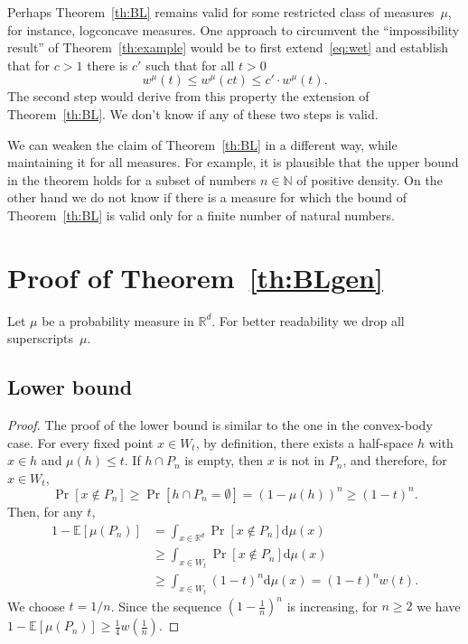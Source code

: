 \documentclass[10pt]{amsart}
\theoremstyle{definition}\newtheorem{defi}[theo]{Definition}\newtheorem{rema}[theo]{Remark}\newtheorem{exam}[theo]{Example}\newtheorem{exem}[theo]{Example}\newtheorem{nota}[theo]{Notation}
\newcommand*{\dd}{\mathrm{d}}
\newcommand{\Nbb}{\mathbb{N}}%
\newcommand{\Rbb}{\mathbb{R}}%
\newcommand{\Ebb}{\mathbb{E}}%
\newcommand*{\mtfrac}[2]{\frac{#1}{#2}}%
\begin{document}
Perhaps Theorem~\ref{th:BL} remains valid for some restricted class of measures~$\mu$, for instance, logconcave measures. One approach to circumvent the ``impossibility result'' of Theorem~\ref{th:example} would be to first extend~\eqref{eq:wet} and establish that for $c>1$ there is $c'$ such that for all $t>0$
\[
w^{\mu}(t) \le w^{\mu}(ct) \le c' \cdot w^{\mu}(t).
\]
The second step would derive from this property the extension of Theorem~\ref{th:BL}. We don't know if any of these two steps is valid.

We can weaken the claim of Theorem~\ref{th:BL} in a different way, while maintaining it for all measures. For example, it is plausible that the upper bound in the theorem holds for a subset of numbers $n \in \Nbb$ of positive density. On the other hand we do not know if there is a measure for which the bound of Theorem~\ref{th:BL} is valid only for a finite number of natural numbers.


\section{Proof of Theorem~\ref{th:BLgen}}\label{sec:proofBLgen}

Let $\mu$ be a probability measure in $\Rbb^d$. For better readability we drop all superscripts~$\mu$.


\subsection{Lower bound}\label{p:lowerbound}
\begin{proof}
The proof of the lower bound is similar to the one in the convex-body case. For every fixed point $x\in W_t$, by definition, there exists a half-space $h$ with $x\in h$ and $\mu(h)\le t$. If $h\cap P_{n}$ is empty, then $x$ is not in $P_{n}$, and therefore, for $x\in W_t$,
\begin{equation}\label{A.}
\Pr[x\notin P_{n}] \ge
\Pr[h\cap P_{n}=\emptyset] = (1-\mu(h))^{n}\ge (1-t)^{n}.
\end{equation}
Then, for any $t$,
\[
\begin{aligned}
1-\Ebb [\mu(P_{n})] & = \int_{x\in \Rbb^d} \Pr[x \notin P_{n}]\dd\mu(x) \\
& \ge \int_{x\in W_t} \Pr[x \notin P_{n}]\dd\mu(x)\\
& \ge \int_{x\in W_t}(1-t)^{n} \dd\mu(x) = (1-t)^{n} w(t).
\end{aligned}
\]
We choose $t=1/n$. Since the sequence $(1-\frac1n)^{n}$ is increasing, for $n \ge 2$ we have $1-\Ebb [\mu(P_{n})] \ge \frac14 w\left(\mtfrac1n\right)$.
\end{proof}
\end{document}
